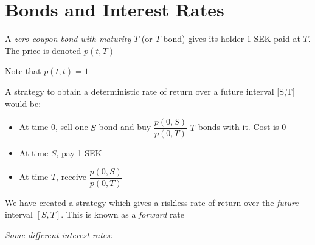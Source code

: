 \section{Bonds and Interest Rates}
\begin{defo}[]{}
  A \textit{zero coupon bond with maturity} $T$ (or $T$-bond) gives its holder 1 SEK paid at $T$. The price is denoted $p(t,T)$
\end{defo}\par
\noindent Note that $p(t,t) = 1$
\par\bigskip
\noindent A strategy to obtain a deterministic rate of return over a future interval [S,T] would be:\par
\begin{itemize}
  \item At time 0, sell one $S$ bond and buy $\dfrac{p(0,S)}{p(0,T)}$ $T$-bonds with it. Cost is 0
  \item At time $S$, pay 1 SEK
  \item At time $T$, receive $\dfrac{p(0,S)}{p(0,T)}$
\end{itemize}\par
\noindent We have created a strategy which gives a riskless rate of return over the \textit{future} interval $[S,T]$. This is known as a \textit{forward} rate
\par\bigskip
\noindent\textit{Some different interest rates:}\par
